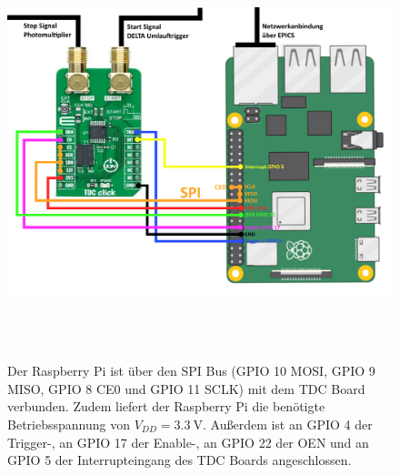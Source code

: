 \begin{figure}
  \centering
  \includegraphics[width=16cm, height=12cm]{content/bilder/RaspiTdcSchaltung.pdf}
  \caption{Der Raspberry Pi ist über den SPI Bus (GPIO 10 MOSI, GPIO 9 MISO, GPIO 8 CE0 und GPIO 11 SCLK) mit dem TDC Board verbunden. 
    Zudem liefert der Raspberry Pi die benötigte Betriebsspannung von $V_{DD}=\SI{3,3}{\volt}$. Außerdem ist an GPIO 4 der
    Trigger-, an GPIO 17 der Enable-, an GPIO 22 der OEN und an GPIO 5 der Interrupteingang des TDC Boards angeschlossen. } 
  \label{fig:raspitdcschaltung}
\end{figure}


